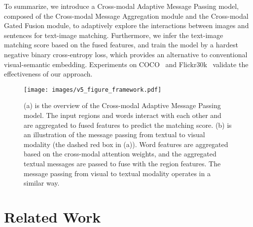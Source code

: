 \documentclass[10pt,twocolumn,letterpaper]{article}
\begin{document}
To summarize, we introduce a Cross-modal Adaptive Message Passing model, composed of the Cross-modal Message Aggregation module and the Cross-modal Gated Fusion module, to adaptively explore the interactions between images and sentences for text-image matching. Furthermore, we infer the text-image matching score based on the fused features, and train the model by a hardest negative binary cross-entropy loss, which provides an alternative to conventional visual-semantic embedding. Experiments on COCO~\cite{lin2014microsoft} and Flickr30k~\cite{karpathy2015deep} validate the effectiveness of our approach.








\begin{figure*}[t]
\begin{center}
   \texttt{[image: images/v5\_figure\_framework.pdf]}
\end{center}
\vspace{-10pt}
   \caption{(a) is the overview of the Cross-modal Adaptive Message Passing model. The input regions and words interact with each other and are aggregated to fused features to predict the matching score. (b) is an illustration of the message passing from textual to visual modality (the dashed red box in (a)). Word features are aggregated based on the cross-modal attention weights, and the aggregated textual messages are passed to fuse with the region features. The message passing from visual to textual modality operates in a similar way.}
\label{fig:three_models}
\vspace{-10pt}
\end{figure*}

\section{Related Work}
\end{document}
